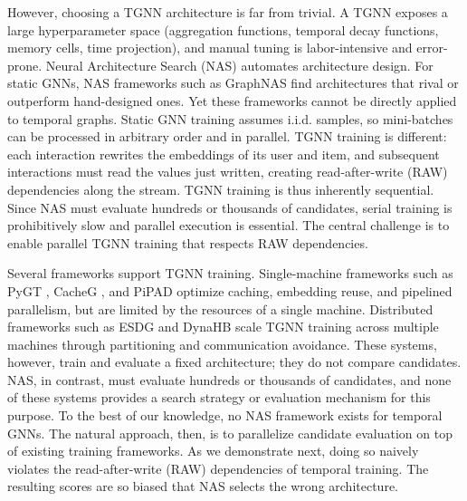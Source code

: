 \documentclass[sigconf, nonacm]{acmart}
\begin{document}
However, choosing a TGNN architecture is far from trivial. A TGNN
exposes a large hyperparameter space (aggregation functions, temporal
decay functions, memory cells, time projection), and manual tuning is
labor-intensive and error-prone. Neural Architecture Search (NAS)
automates architecture design. For static GNNs, NAS frameworks such as
GraphNAS \cite{graphnas} find architectures that rival or outperform
hand-designed ones. Yet these frameworks cannot be directly applied to
temporal graphs. Static GNN training assumes i.i.d. samples, so
mini-batches can be processed in arbitrary order and in parallel. TGNN
training is different: each interaction rewrites the embeddings of its
user and item, and subsequent interactions must read the values just
written, creating read-after-write (RAW) dependencies along the
stream. TGNN training is thus inherently sequential. Since NAS must
evaluate hundreds or thousands of candidates, serial training is
prohibitively slow and parallel execution is essential. The central
challenge is to enable parallel TGNN training that respects RAW
dependencies.

Several frameworks support TGNN training. Single-machine frameworks
such as PyGT \cite{pygt}, CacheG \cite{cacheg}, and PiPAD \cite{pipad}
optimize caching, embedding reuse, and pipelined parallelism, but are
limited by the resources of a single machine. Distributed frameworks
such as ESDG \cite{esdg} and DynaHB \cite{dynahb} scale TGNN training
across multiple machines through partitioning and communication
avoidance. These systems, however, train and evaluate a fixed
architecture; they do not compare candidates. NAS, in contrast, must
evaluate hundreds or thousands of candidates, and none of these
systems provides a search strategy or evaluation mechanism for this
purpose. To the best of our knowledge, no NAS framework exists for
temporal GNNs. The natural approach, then, is to parallelize candidate
evaluation on top of existing training frameworks. As we demonstrate
next, doing so naively violates the read-after-write (RAW)
dependencies of temporal training. The resulting scores are so biased
that NAS selects the wrong architecture.
\end{document}
